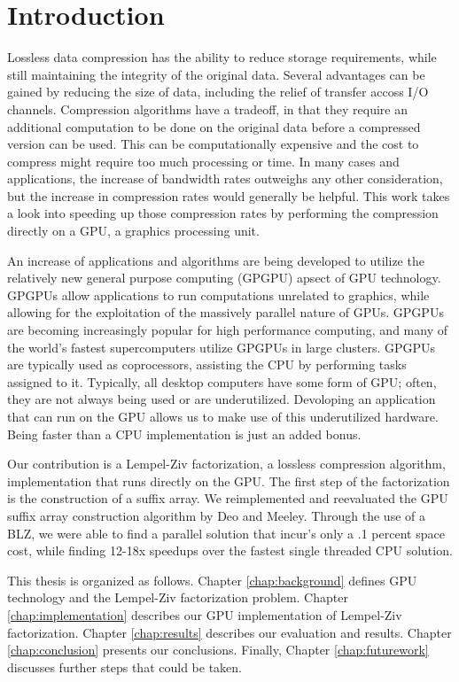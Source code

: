 \chapter{Introduction}
Lossless data compression has the ability to reduce storage requirements, while still maintaining the integrity of the original data.
Several advantages can be gained by reducing the size of data, including the relief of transfer accoss I/O channels.
Compression algorithms have a tradeoff, in that they require an additional computation to be done on the original data before a compressed version can be used.
This can be computationally expensive and the cost to compress might require too much processing or time.
In many cases and applications, the increase of bandwidth rates outweighs any other consideration, but the increase in compression rates would generally be helpful.
This work takes a look into speeding up those compression rates by performing the compression directly on a GPU, a graphics processing unit.

An increase of applications and algorithms are being developed to utilize the relatively new general purpose computing (GPGPU) apsect of GPU technology.
GPGPUs allow applications to run computations unrelated to graphics, while allowing for the exploitation of the massively parallel nature of GPUs.
GPGPUs are becoming increasingly popular for high performance computing, and many of the world's fastest supercomputers utilize GPGPUs in large clusters.
GPGPUs are typically used as coprocessors, assisting the CPU by performing tasks assigned to it.
Typically, all desktop computers have some form of GPU; often, they are not always being used or are underutilized.
Devoloping an application that can run on the GPU allows us to make use of this underutilized hardware.
Being faster than a CPU implementation is just an added bonus.


Our contribution is a Lempel-Ziv factorization, a lossless compression algorithm, implementation that runs directly on the GPU.
The first step of the factorization is the construction of a suffix array.
We reimplemented and reevaluated the GPU suffix array construction algorithm by Deo and Meeley\cite{Deo}.
Through the use of a BLZ, we were able to find a parallel solution that incur's only a .1 percent space cost, while finding 12-18x speedups over the fastest single threaded CPU solution.

This thesis is organized as follows.
Chapter \ref{chap:background} defines GPU technology and the Lempel-Ziv factorization problem.
Chapter \ref{chap:implementation} describes our GPU implementation of Lempel-Ziv factorization.
Chapter \ref{chap:results} describes our evaluation and results.
Chapter \ref{chap:conclusion} presents our conclusions.
Finally, Chapter \ref{chap:futurework} discusses further steps that could be taken.
